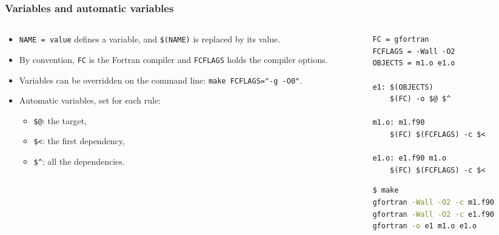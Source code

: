 \begin{frame}[fragile]
  \frametitle{Variables and automatic variables}
  \begin{columns}[T]
    \begin{column}{0.5\textwidth}
      \begin{itemize}
        \item \texttt{NAME = value} defines a variable, and \texttt{\$(NAME)} is replaced by its value.
        \item By convention, \texttt{FC} is the Fortran compiler and \texttt{FCFLAGS} holds the compiler options.
        \item Variables can be overridden on the command line: \texttt{make FCFLAGS="-g -O0"}.
        \item Automatic variables, set for each rule:
          \begin{itemize}
            \item \texttt{\$@}: the target,
            \item \texttt{\$<}: the first dependency,
            \item \texttt{\$\^{}}: all the dependencies.
          \end{itemize}
      \end{itemize}
    \end{column}

    \begin{column}{0.5\textwidth}
      \begin{lstlisting}[language={[gnu]make}, tabsize=4]
FC = gfortran
FCFLAGS = -Wall -O2
OBJECTS = m1.o e1.o

e1: $(OBJECTS)
	$(FC) -o $@ $^

m1.o: m1.f90
	$(FC) $(FCFLAGS) -c $<

e1.o: e1.f90 m1.o
	$(FC) $(FCFLAGS) -c $<
      \end{lstlisting}
      \begin{lstlisting}[language=bash]
$ make
gfortran -Wall -O2 -c m1.f90
gfortran -Wall -O2 -c e1.f90
gfortran -o e1 m1.o e1.o
      \end{lstlisting}
    \end{column}
  \end{columns}
\end{frame}


